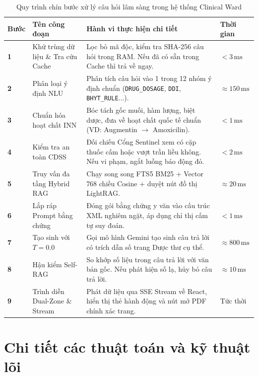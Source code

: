 \documentclass[12pt,a4paper]{article}
\begin{document}
\begin{table}[htbp]
\centering
\small
\renewcommand{\arraystretch}{1.25}
\begin{tabularx}{\textwidth}{C{1.2cm} L{3.8cm} Y L{2.2cm}}
\toprule
\textbf{Bước} & \textbf{Tên công đoạn} & \textbf{Hành vi thực hiện chi tiết} & \textbf{Thời gian} \\
\midrule
\textbf{1} & Khử trùng dữ liệu \& Tra cứu Cache & Lọc bỏ mã độc, kiểm tra SHA-256 câu hỏi trong RAM. Nếu đã có sẵn trong Cache thì trả về ngay. & $< 3\,\text{ms}$ \\
\textbf{2} & Phân loại ý định NLU & Phân tích câu hỏi vào 1 trong 12 nhóm ý định chuẩn (\texttt{DRUG\_DOSAGE}, \texttt{DDI}, \texttt{BHYT\_RULE}...). & $\approx 150\,\text{ms}$ \\
\textbf{3} & Chuẩn hóa hoạt chất INN & Bóc tách gốc muối, hàm lượng, biệt dược, đưa về hoạt chất quốc tế chuẩn (VD: Augmentin $\to$ Amoxicilin). & $< 1\,\text{ms}$ \\
\textbf{4} & Kiểm tra an toàn CDSS & Đối chiếu Cổng Sentinel xem có cặp thuốc cấm hoặc vượt trần liều không. Nếu vi phạm, ngắt luồng báo động đỏ. & $< 2\,\text{ms}$ \\
\textbf{5} & Truy vấn đa tầng Hybrid RAG & Chạy song song FTS5 BM25 + Vector 768 chiều Cosine + duyệt nút đồ thị LightRAG. & $\approx 20\,\text{ms}$ \\
\textbf{6} & Lắp ráp Prompt bằng chứng & Đóng gói bằng chứng y văn vào cấu trúc XML nghiêm ngặt, áp dụng chỉ thị cấm tự suy đoán. & $< 1\,\text{ms}$ \\
\textbf{7} & Tạo sinh với $T = 0.0$ & Gọi mô hình Gemini tạo sinh câu trả lời có trích dẫn số trang Dược thư cụ thể. & $\approx 800\,\text{ms}$ \\
\textbf{8} & Hậu kiểm Self-RAG & So khớp số liệu trong câu trả lời với văn bản gốc. Nếu phát hiện số lạ, hủy bỏ câu trả lời. & $\approx 10\,\text{ms}$ \\
\textbf{9} & Trình diễn Dual-Zone \& Stream & Phát dữ liệu qua SSE Stream về React, hiển thị thẻ hành động và nút mở PDF chính xác trang. & Tức thời \\
\bottomrule
\end{tabularx}
\caption{Quy trình chín bước xử lý câu hỏi lâm sàng trong hệ thống Clinical Ward}
\end{table}

\section{Chi tiết các thuật toán và kỹ thuật lõi}
\end{document}
